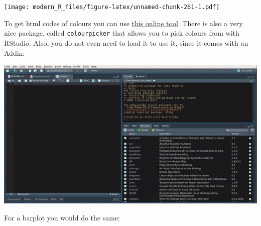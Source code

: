 \documentclass[]{gitbook}
\newenvironment{Shaded}{\begin{snugshade}}{\end{snugshade}}
\newcommand{\DataTypeTok}[1]{\textcolor[rgb]{0.13,0.29,0.53}{#1}}
\newcommand{\FloatTok}[1]{\textcolor[rgb]{0.00,0.00,0.81}{#1}}
\newcommand{\KeywordTok}[1]{\textcolor[rgb]{0.13,0.29,0.53}{\textbf{#1}}}
\newcommand{\NormalTok}[1]{#1}
\newcommand{\OperatorTok}[1]{\textcolor[rgb]{0.81,0.36,0.00}{\textbf{#1}}}
\newcommand{\StringTok}[1]{\textcolor[rgb]{0.31,0.60,0.02}{#1}}
\theoremstyle{definition}
\theoremstyle{definition}
\theoremstyle{definition}
\theoremstyle{remark}
\begin{document}
\texttt{[image: modern\_R\_files/figure-latex/unnamed-chunk-261-1.pdf]}

To get html codes of colours you can use
\href{http://htmlcolorcodes.com/color-picker/}{this online tool}. There
is also a very nice package, called \texttt{colourpicker} that allows
you to pick colours from with RStudio. Also, you do not even need to
load it to use it, since it comes with an Addin:

\includegraphics{pics/rstudio_colourpicker.gif}

For a barplot you would do the same:

\begin{Shaded}
\end{Shaded}
\end{document}
